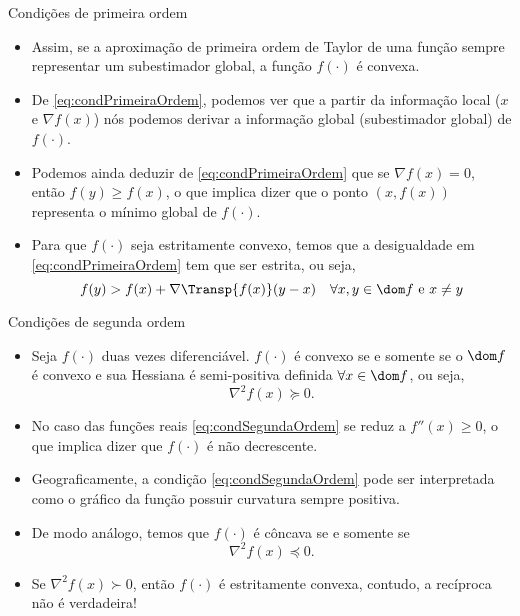 \begin{frame}{Condições de primeira ordem}
  \begin{itemize}
    \item Assim, se a aproximação de primeira ordem de Taylor de uma função sempre representar um subestimador global, 
    a função $f(\cdot)$ é convexa.
    \item De \eqref{eq:condPrimeiraOrdem}, podemos ver que a partir da informação local ($x$ e $\nabla f(x)$) nós 
    podemos derivar a informação global (subestimador global) de $f(\cdot)$.
    \item Podemos ainda deduzir de \eqref{eq:condPrimeiraOrdem} que se $\nabla f(x) = 0$, então $f(y) \geq f(x)$, o que 
    implica dizer que o ponto $(x, f(x))$ representa o mínimo global de $f(\cdot)$.
    \item Para que $f(\cdot)$ seja estritamente convexo, temos que a desigualdade em \eqref{eq:condPrimeiraOrdem} tem 
    que ser estrita, ou seja,
    \begin{equation}
      f(y) > f(x) + \nabla \Transp{f(x)} (y-x) \,\,\,\,\,\, \forall x,y \in \dom f \text{ e } x \neq y
      \label{eq:condPrimeiraOrdemEstrita}
    \end{equation} 
  \end{itemize}
\end{frame}

\begin{frame}{Condições de segunda ordem}
  \begin{itemize}
    \item Seja $f(\cdot)$ duas vezes diferenciável. $f(\cdot)$ é convexo se e somente se o $\dom f$ é convexo e sua 
    Hessiana é semi-positiva definida $\forall x \in \dom f$, ou seja,
    \begin{equation}
      \nabla^2 f(x) \succeq 0.
      \label{eq:condSegundaOrdem}
    \end{equation}
    \item No caso das funções reais \eqref{eq:condSegundaOrdem} se reduz a $f''(x) \geq 0$, o que implica dizer que 
    $f(\cdot)$ é não decrescente.
    \item Geograficamente, a condição \eqref{eq:condSegundaOrdem} pode ser interpretada como o gráfico da função 
    possuir curvatura sempre positiva.
    \item De modo análogo, temos que $f(\cdot)$ é côncava se e somente se
    \begin{equation}
      \nabla^2 f(x) \preceq 0.
      \label{eq:condSegundaOrdemConcava}
    \end{equation}
    \item Se $\nabla^2 f(x) \succ 0$, então $f(\cdot)$ é estritamente convexa, contudo, \alert{a recíproca não é 
    verdadeira!}
  \end{itemize}
\end{frame}

